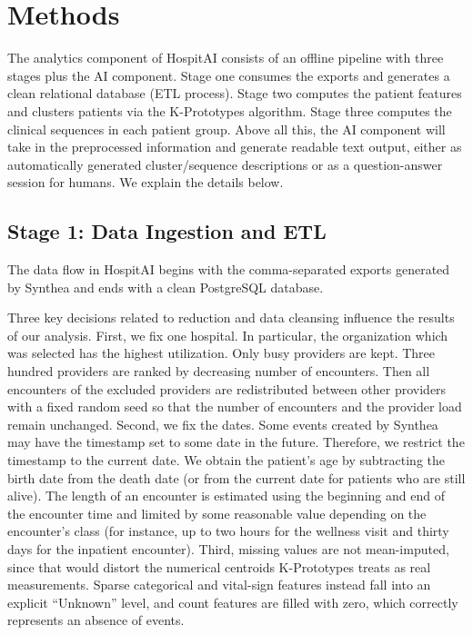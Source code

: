\section{Methods}
\label{sec:methods}

The analytics component of HospitAI consists of an offline pipeline with three stages plus the AI component. Stage one consumes the exports and generates a clean relational database (ETL process). Stage two computes the patient features and clusters patients via the K-Prototypes algorithm. Stage three computes the clinical sequences in each patient group. Above all this, the AI component will take in the preprocessed information and generate readable text output, either as automatically generated cluster/sequence descriptions or as a question-answer session for humans. We explain the details below.

\subsection{Stage 1: Data Ingestion and ETL}

The data flow in HospitAI begins with the comma-separated exports generated by Synthea and ends with a clean PostgreSQL database.

Three key decisions related to reduction and data cleansing influence the results of our analysis. First, we fix one hospital. In particular, the organization which was selected has the highest utilization. Only busy providers are kept. Three hundred providers are ranked by decreasing number of encounters. Then all encounters of the excluded providers are redistributed between other providers with a fixed random seed so that the number of encounters and the provider load remain unchanged. Second, we fix the dates. Some events created by Synthea may have the timestamp set to some date in the future. Therefore, we restrict the timestamp to the current date. We obtain the patient's age by subtracting the birth date from the death date (or from the current date for patients who are still alive). The length of an encounter is estimated using the beginning and end of the encounter time and limited by some reasonable value depending on the encounter's class (for instance, up to two hours for the wellness visit and thirty days for the inpatient encounter). Third, missing values are not mean-imputed, since that would distort the numerical centroids K-Prototypes treats as real measurements. Sparse categorical and vital-sign features instead fall into an explicit ``Unknown'' level, and count features are filled with zero, which correctly represents an absence of events.

